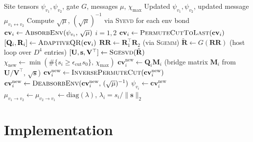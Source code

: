 \documentclass[11pt]{article}
\newcommand{\chimax}{\chi_{\mathrm{max}}}
\begin{document}
\begin{algorithm}
\caption{Gate update for bond $(v_1, v_2)$.}
\label{alg:gate}
\begin{algorithmic}[1]
\Require Site tensors $\psi_{v_1}, \psi_{v_2}$, gate $G$, messages $\mu$, $\chimax$
\Ensure Updated $\psi_{v_1}, \psi_{v_2}$, updated message $\mu_{v_1 \leftrightarrow v_2}$
\State Compute $\sqrt{\mu}$, $(\sqrt{\mu})^{-1}$ via \textsc{Syevd} for each env bond
\State $\mathbf{cv}_i \leftarrow \textsc{AbsorbEnv}(\psi_{v_i},\, \sqrt{\mu})$
 \quad $i = 1, 2$
\State $\mathbf{cv}_i \leftarrow \textsc{PermuteCutToLast}(\mathbf{cv}_i)$
\State $[\mathbf{Q}_i, \mathbf{R}_i] \leftarrow \textsc{AdaptiveQR}(\mathbf{cv}_i)$
\State $\mathbf{RR} \leftarrow \mathbf{R}_1^\top \mathbf{R}_2$
 \quad (via \textsc{Sgemm})
\State $\tilde{\mathbf{R}} \leftarrow G(\mathbf{RR})$
 \quad (host loop over $D^4$ entries)
\State $[\mathbf{U}, \mathbf{s}, \mathbf{V}^\top] \leftarrow \textsc{Sgesvd}(\tilde{\mathbf{R}})$
\State $\chi_{\text{new}} \leftarrow \min(\#\{s_i \geq \epsilon_{\text{cut}} s_0\},\, \chimax)$
\State $\mathbf{cv}_i^{\text{new}} \leftarrow \mathbf{Q}_i \mathbf{M}_i$
 \quad (bridge matrix $\mathbf{M}_i$ from $\mathbf{U}/\mathbf{V}^\top$, $\sqrt{\mathbf{s}}$)
\State $\mathbf{cv}_i^{\text{new}} \leftarrow \textsc{InversePermuteCut}(\mathbf{cv}_i^{\text{new}})$
\State $\mathbf{cv}_i^{\text{new}} \leftarrow \textsc{DeabsorbEnv}(\mathbf{cv}_i^{\text{new}},\,
 (\sqrt{\mu})^{-1})$
\State $\psi_{v_i} \leftarrow \mathbf{cv}_i^{\text{new}}$
\State $\mu_{v_1 \to v_2} \leftarrow \mu_{v_2 \to v_1}
 \leftarrow \mathrm{diag}(\lambda)$,
 \quad $\lambda_i = s_i/\|\mathbf{s}\|_2$
\end{algorithmic}
\end{algorithm}

\section{Implementation}
\label{sec:implementation}
\end{document}
